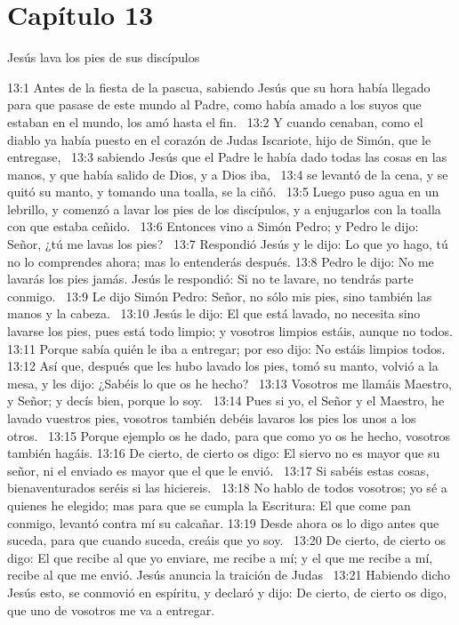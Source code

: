 \section*{Capítulo 13}
Jesús lava los pies de sus discípulos 

13:1 Antes de la fiesta de la pascua, sabiendo Jesús que su hora había llegado para que pasase de este mundo al Padre, como había amado a los suyos que estaban en el mundo, los amó hasta el fin.  
13:2 Y cuando cenaban, como el diablo ya había puesto en el corazón de Judas Iscariote, hijo de Simón, que le entregase,  
13:3 sabiendo Jesús que el Padre le había dado todas las cosas en las manos, y que había salido de Dios, y a Dios iba,  
13:4 se levantó de la cena, y se quitó su manto, y tomando una toalla, se la ciñó.  
13:5 Luego puso agua en un lebrillo, y comenzó a lavar los pies de los discípulos, y a enjugarlos con la toalla con que estaba ceñido.  
13:6 Entonces vino a Simón Pedro; y Pedro le dijo: Señor, ¿tú me lavas los pies?  
13:7 Respondió Jesús y le dijo: Lo que yo hago, tú no lo comprendes ahora; mas lo entenderás después. 
13:8 Pedro le dijo: No me lavarás los pies jamás. Jesús le respondió: Si no te lavare, no tendrás parte conmigo.  
13:9 Le dijo Simón Pedro: Señor, no sólo mis pies, sino también las manos y la cabeza.  
13:10 Jesús le dijo: El que está lavado, no necesita sino lavarse los pies, pues está todo limpio; y vosotros limpios estáis, aunque no todos. 
13:11 Porque sabía quién le iba a entregar; por eso dijo: No estáis limpios todos. 
13:12 Así que, después que les hubo lavado los pies, tomó su manto, volvió a la mesa, y les dijo: ¿Sabéis lo que os he hecho?  
13:13 Vosotros me llamáis Maestro, y Señor; y decís bien, porque lo soy.  
13:14 Pues si yo, el Señor y el Maestro, he lavado vuestros pies, vosotros también debéis lavaros los pies los unos a los otros.  
13:15 Porque ejemplo os he dado, para que como yo os he hecho, vosotros también hagáis. 
13:16 De cierto, de cierto os digo: El siervo no es mayor que su señor, ni el enviado es mayor que el que le envió.  
13:17 Si sabéis estas cosas, bienaventurados seréis si las hiciereis.  
13:18 No hablo de todos vosotros; yo sé a quienes he elegido; mas para que se cumpla la Escritura: El que come pan conmigo, levantó contra mí su calcañar. 
13:19 Desde ahora os lo digo antes que suceda, para que cuando suceda, creáis que yo soy.  
13:20 De cierto, de cierto os digo: El que recibe al que yo enviare, me recibe a mí; y el que me recibe a mí, recibe al que me envió. 
Jesús anuncia la traición de Judas   
13:21 Habiendo dicho Jesús esto, se conmovió en espíritu, y declaró y dijo: De cierto, de cierto os digo, que uno de vosotros me va a entregar.  

